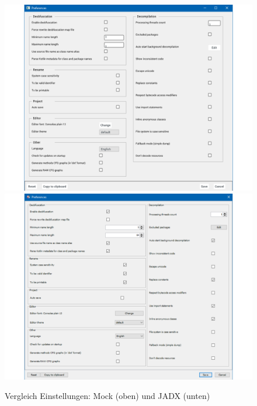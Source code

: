 \begin{figure}[p]
    \centering
    \includegraphics[height=.45\textheight]{bilder/jadx_mock_settings.png}
    \includegraphics[height=.45\textheight]{bilder/jadx_settings.png}
    \caption{Vergleich Einstellungen: Mock (oben) und JADX (unten)}
    \label{fig:mock_settings_comparison}
\end{figure}

